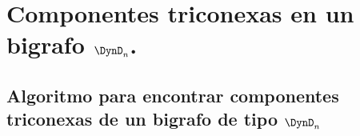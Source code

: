 \chapter{Componentes triconexas en un bigrafo $\DynD_{n}$.}

\section{Algoritmo para encontrar componentes triconexas de un bigrafo de tipo $\DynD_{n}$}

\paragraph{}
